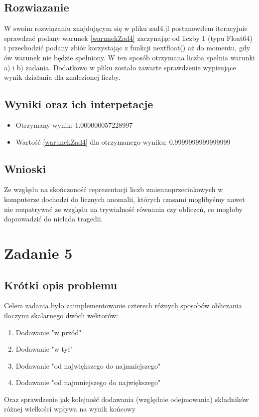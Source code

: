\documentclass[a4paper,14pt]{report}
\begin{document}
\section{Rozwiazanie}
W swoim rozwiązaniu znajdującym się w pliku zad4.jl postanowiłem iteracyjnie sprawdzać podany warunek \ref{warunekZad4} zaczynając od liczby 1 (typu Float64) i przechodzić podany zbiór korzystając z funkcji nextfloat() aż do momentu, gdy ów warunek nie będzie spełniony. W ten sposób otrzymana liczba spełnia warunki a) i b) zadania.
Dodatkowo w pliku zostało zawarte sprawdzenie wypisujące wynik działania dla znalezionej liczby.

\section{Wyniki oraz ich interpetacje}
\begin{itemize}
\item Otrzymany wynik: 1.000000057228997
\item Wartość \ref{warunekZad4} dla otrzymanego wyniku: 0.9999999999999999
\end{itemize}
\section{Wnioski}
Ze względu na skończoność reprezentacji liczb zmiennoprzecinkowych w komputerze dochodzi do licznych anomalii, których czasami moglibyśmy nawet nie rozpatrywać ze względu na trywialność równania czy obliczeń, co mogłoby doprowadzić do nielada tragedii.




\chapter{Zadanie 5}
\section{Krótki opis problemu}
Celem zadania było zaimplementowanie czterech różnych sposobów obliczania iloczynu skalarnego dwóch wektorów:
\begin{enumerate}
  \item Dodawanie "w przód"
  \item Dodawanie "w tył"
  \item Dodawanie "od największego do najmniejszego"
  \item Dodawanie "od najmniejszego do największego"
\end{enumerate}
Oraz sprawdzenie jak kolejność dodawania (względnie odejmowania) składników różnej wielkości wpływa na wynik końcowy
\end{document}
